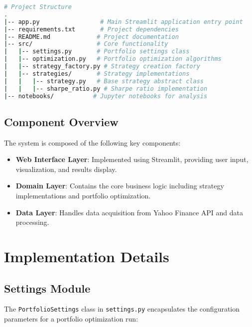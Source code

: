 \documentclass[11pt,a4paper]{article}
\begin{document}
\begin{lstlisting}[language=bash]
# Project Structure
.
|-- app.py                 # Main Streamlit application entry point
|-- requirements.txt       # Project dependencies
|-- README.md             # Project documentation
|-- src/                  # Core functionality
|   |-- settings.py       # Portfolio settings class
|   |-- optimization.py   # Portfolio optimization algorithms
|   |-- strategy_factory.py # Strategy creation factory
|   |-- strategies/       # Strategy implementations
|   |   |-- strategy.py   # Base strategy abstract class
|   |   |-- sharpe_ratio.py # Sharpe ratio implementation
|-- notebooks/           # Jupyter notebooks for analysis
\end{lstlisting}

\subsection{Component Overview}

The system is composed of the following key components:

\begin{itemize}
    \item \textbf{Web Interface Layer}: Implemented using Streamlit, providing user input, visualization, and results display.
    \item \textbf{Domain Layer}: Contains the core business logic including strategy implementations and portfolio optimization.
    \item \textbf{Data Layer}: Handles data acquisition from Yahoo Finance API and data processing.
\end{itemize}

\section{Implementation Details}

\subsection{Settings Module}

The \texttt{PortfolioSettings} class in \texttt{settings.py} encapsulates the configuration parameters for a portfolio optimization run:
\end{document}
